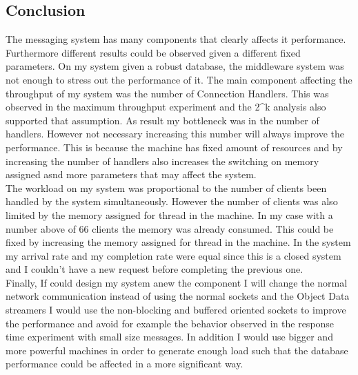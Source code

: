 \subsection{Conclusion}\label{sec:conclusion}
The messaging system has many components that clearly affects it performance. Furthermore different results could be observed given a different fixed parameters. On my system given a robust database, the middleware system was not enough to stress out the performance of it. The main component affecting the throughput of my system was the number of Connection Handlers. This was observed in the maximum throughput experiment and the 2\^{}k analysis also supported that assumption. As result my bottleneck was in the number of handlers. However not necessary increasing this number will always improve the performance. This is because the machine has fixed amount of resources and by increasing the number of handlers also increases the switching on memory assigned asnd more parameters that may affect the system.\\

The workload on my system was proportional to the number of clients been handled by the system simultaneously. However the number of clients was also limited by the memory assigned for thread in the machine. In my case with a number above of 66 clients the memory was already consumed. This could be fixed by increasing the memory assigned for thread in the machine. In the system my arrival rate and my completion rate were equal since this is a closed system and I couldn’t have a new request before completing the previous one.\\

Finally, If could design my system anew the component I will change the normal network communication instead of using the normal sockets and the Object Data streamers I would use the non-blocking and buffered oriented sockets to improve the performance and avoid for example the behavior observed in the response time experiment with small size messages. In addition I would use bigger and more powerful machines in order to generate enough load such that the database performance could be affected in a more significant way.\\

